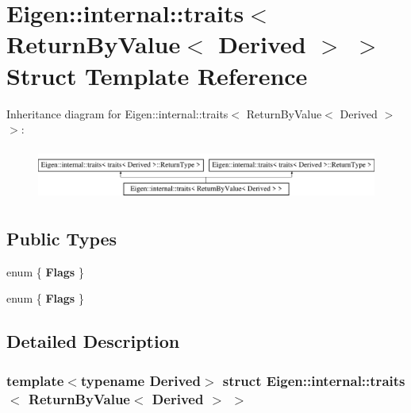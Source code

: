 \hypertarget{struct_eigen_1_1internal_1_1traits_3_01_return_by_value_3_01_derived_01_4_01_4}{}\section{Eigen\+:\+:internal\+:\+:traits$<$ Return\+By\+Value$<$ Derived $>$ $>$ Struct Template Reference}
\label{struct_eigen_1_1internal_1_1traits_3_01_return_by_value_3_01_derived_01_4_01_4}
Inheritance diagram for Eigen\+:\+:internal\+:\+:traits$<$ Return\+By\+Value$<$ Derived $>$ $>$\+:\begin{figure}[H]
\begin{center}
\leavevmode
\includegraphics[height=1.728395cm]{struct_eigen_1_1internal_1_1traits_3_01_return_by_value_3_01_derived_01_4_01_4}
\end{center}
\end{figure}
\subsection*{Public Types}
\begin{DoxyCompactItemize}
\item 
\mbox{\label{struct_eigen_1_1internal_1_1traits_3_01_return_by_value_3_01_derived_01_4_01_4_a3ee94326dd4a874778c3a44b05527124}} 
enum \{ {\bfseries Flags}
 \}
\item 
\mbox{\label{struct_eigen_1_1internal_1_1traits_3_01_return_by_value_3_01_derived_01_4_01_4_ae26f9ea0d382ad4b2c40789973ade17e}} 
enum \{ {\bfseries Flags}
 \}
\end{DoxyCompactItemize}


\subsection{Detailed Description}
\subsubsection*{template$<$typename Derived$>$\newline
struct Eigen\+::internal\+::traits$<$ Return\+By\+Value$<$ Derived $>$ $>$}



